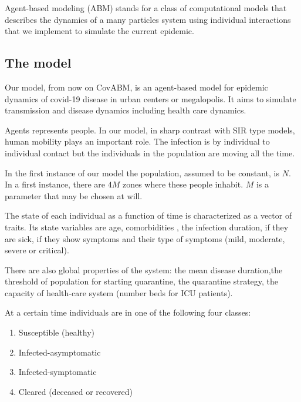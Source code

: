 \documentclass[11pt,a4paper,reqno]{amsart}
\theoremstyle{definition}
\theoremstyle{remark}
\begin{document}
Agent-based modeling (ABM) stands for a class of computational models that describes the dynamics of a many particles system using individual interactions that we implement to simulate the current epidemic.



\subsection{The model} Our model, from now on CovABM, is an agent-based model for epidemic dynamics of covid-19 disease in urban centers or megalopolis. It aims to simulate transmission and disease dynamics including health care dynamics.


Agents represents people. In our model, in sharp contrast with SIR type models, human mobility plays an important role. The infection is by individual to individual contact but the individuals in the population are moving all the time. 

In the first instance of our model the population, assumed to be constant, is $N$. In a first instance, there are $4M$ zones where these people inhabit. $M$ is a parameter that may be chosen at will.

The state of each individual as a function of time is characterized as a vector of traits. Its state variables are age, comorbidities , the infection duration, if they are sick, if they show symptoms and their type of symptoms (mild, moderate, severe or critical).

There are also global properties of the system: the mean disease duration,the threshold of population for starting quarantine, the quarantine strategy, the capacity of health-care system (number beds for ICU patients).

At a certain time individuals are in one of the following four classes: 

\begin{enumerate}
\item Susceptible (healthy)
\item Infected-asymptomatic
\item Infected-symptomatic
\item Cleared (deceased or recovered)
\end{enumerate}
\end{document}
